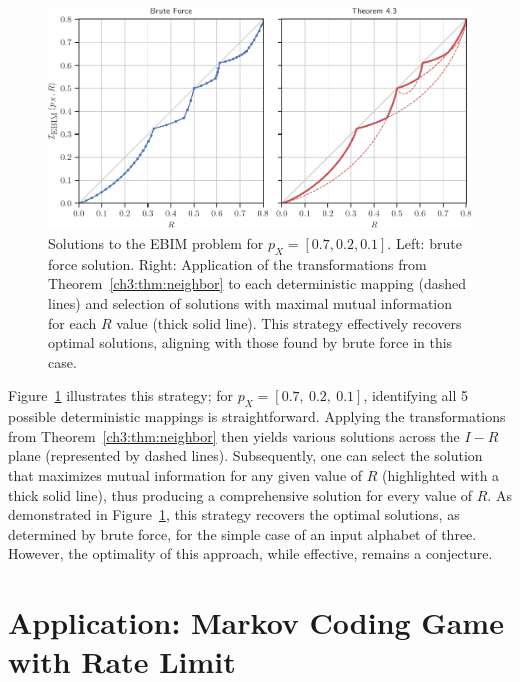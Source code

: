 \begin{figure}[h!]
    \centering
    \includegraphics[width=1\linewidth]{figs/ch3/numerical_theorem1.pdf}
    \caption{
    Solutions to the EBIM problem for $p_X=[0.7, 0.2, 0.1]$. Left: brute force solution. Right: Application of the transformations from Theorem~\ref{ch3:thm:neighbor} to each deterministic mapping (dashed lines) and selection of solutions with maximal mutual information for each $R$ value (thick solid line). This strategy effectively recovers optimal solutions, aligning with those found by brute force in this case.
    }
    \label{ch3:fig:numericalvstheorem}
\end{figure}

Figure~\ref{ch3:fig:numericalvstheorem} illustrates this strategy; for $p_X=[0.7,\ 0.2,\ 0.1]$, identifying all 5 possible deterministic mappings is straightforward. Applying the transformations from Theorem~\ref{ch3:thm:neighbor} then yields various solutions across the $I-R$ plane (represented by dashed lines). Subsequently, one can select the solution that maximizes mutual information for any given value of $R$ (highlighted with a thick solid line), thus producing a comprehensive solution for every value of $R$. As demonstrated in Figure~\ref{ch3:fig:numericalvstheorem}, this strategy recovers the optimal solutions, as determined by brute force, for the simple case of an input alphabet of three. However, the optimality of this approach, while effective, remains a conjecture.

\section{Application: Markov Coding Game with Rate Limit} \label{ch3:sec:mcg}

